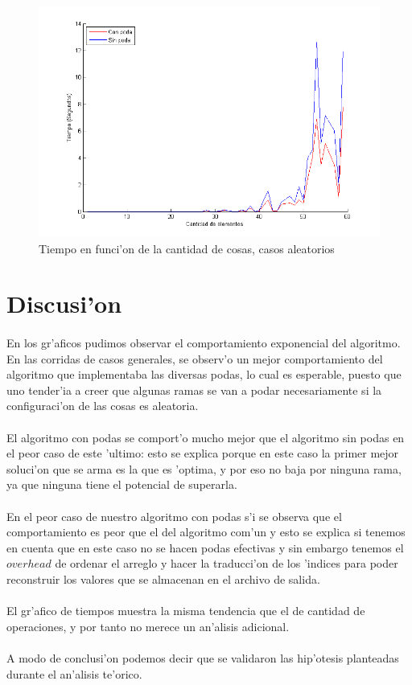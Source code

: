 \begin{figure}[H]
\centering
\includegraphics[scale=0.7]{../../codigo/ejercicio2/benchmark_tiempos/graficos/tiempo_caso_promedio/ComparacionPodavsSinPoda.png}
\caption{Tiempo en funci'on de la cantidad de cosas, casos aleatorios}
\label{Ej2fig4}
\end{figure}

\newpage
\section{Discusi'on}
\paragraph{}
En los gr'aficos pudimos observar el comportamiento exponencial del algoritmo. En las corridas de casos generales,
se observ'o un mejor comportamiento del algoritmo que implementaba las diversas podas, lo cual es esperable, puesto
que uno tender'ia a creer que algunas ramas se van a podar necesariamente si la configuraci'on de las cosas es aleatoria.
\paragraph{}
El algoritmo con podas se comport'o mucho mejor que el algoritmo sin podas en el peor caso de este 'ultimo: esto se 
explica porque en este caso la primer mejor soluci'on que se arma es la que es 'optima, y por eso no baja por ninguna 
rama, ya que ninguna tiene el potencial de superarla.
\paragraph{}
En el peor caso de nuestro algoritmo con podas s'i se observa que el comportamiento es peor que el del algoritmo 
com'un y esto se explica si tenemos en cuenta que en este caso no se hacen podas efectivas y sin embargo tenemos 
el \textsl{$overhead$} de ordenar el arreglo y hacer la traducci'on de los 'indices para poder reconstruir los valores que
se almacenan en el archivo de salida.
\paragraph{} 
El gr'afico de tiempos muestra la misma tendencia que el de cantidad de operaciones, y por tanto no merece
un an'alisis adicional.
\paragraph{} 
A modo de conclusi'on podemos decir que se validaron las hip'otesis planteadas durante el an'alisis te'orico.

